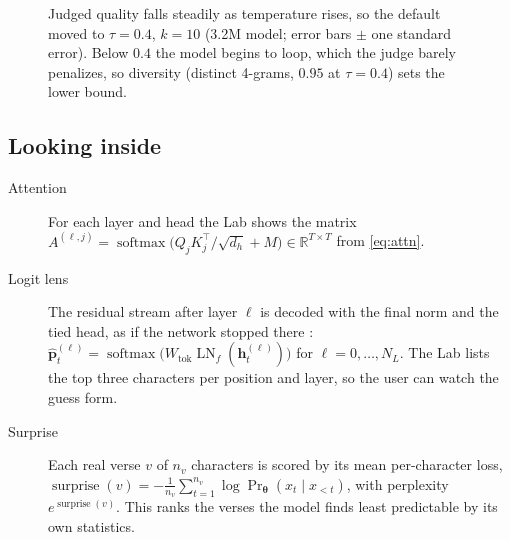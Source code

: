 \documentclass[11pt]{article}
\newcommand{\R}{\mathbb{R}}
\newcommand{\softmax}{\operatorname{softmax}}
\newcommand{\LN}{\operatorname{LN}}
\begin{document}
\begin{figure}[htbp]
\centering
{}
\caption{Judged quality falls steadily as temperature rises, so the default
moved to $\tau = 0.4$, $k = 10$ (3.2M model; error bars $\pm$ one standard error).
Below $0.4$ the model begins to loop, which the judge barely penalizes, so
diversity (distinct 4-grams, $0.95$ at $\tau = 0.4$) sets the lower bound.}
\label{fig:tune}
\end{figure}

\subsection{Looking inside}

\begin{description}
  \item[Attention] For each layer and head the Lab shows the matrix
        $A^{(\ell, j)} = \softmax\bigl(Q_j K_j^\top/\sqrt{d_h} + M\bigr) \in \R^{T\times T}$
        from \cref{eq:attn}.
  \item[Logit lens] The residual stream after layer $\ell$ is decoded with the
        final norm and the tied head, as if the network stopped there
        \cite{logitlens}:
        $\hat{\bm{p}}^{(\ell)}_t = \softmax\bigl(W_{\text{tok}}\LN_f(\bm{h}^{(\ell)}_t)\bigr)$
        for $\ell = 0, \dots, N_L$. The Lab lists the top three characters per
        position and layer, so the user can watch the guess form.
  \item[Surprise] Each real verse $v$ of $n_v$ characters is scored by its mean
        per-character loss,
        $\operatorname{surprise}(v) = -\frac{1}{n_v}\sum_{t=1}^{n_v}\log \Pr_{\bm\theta}(x_t \mid x_{<t})$,
        with perplexity $e^{\operatorname{surprise}(v)}$. This ranks the verses
        the model finds least predictable by its own statistics.
\end{description}
\end{document}
